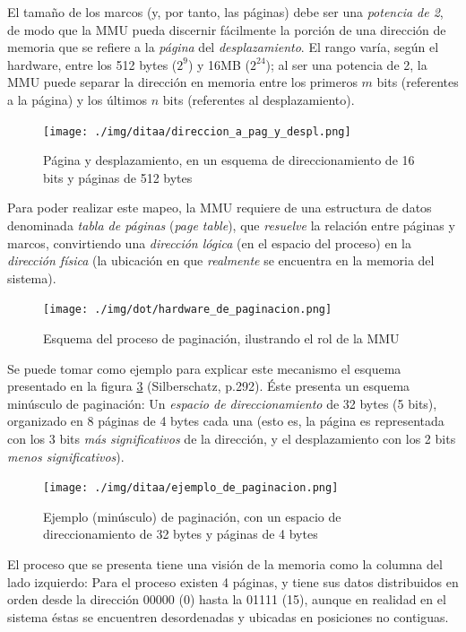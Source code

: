 \documentclass[11pt,fleqn]{book} %
\begin{document}
El tamaño de los marcos (y, por tanto, las páginas) debe ser una
\emph{potencia de 2}, de modo que la MMU pueda discernir fácilmente la
porción de una dirección de memoria que se refiere a la \emph{página} del
\emph{desplazamiento}. El rango varía, según el hardware, entre los 512
bytes ($2^9$) y 16MB ($2^{24}$); al ser una potencia de 2, la MMU puede
separar la dirección en memoria entre los primeros $m$ bits
(referentes a la página) y los últimos $n$ bits (referentes al
desplazamiento).

\begin{figure}[htb]
\centering
\texttt{[image: ./img/ditaa/direccion\_a\_pag\_y\_despl.png]}
\caption{\label{MEM_direccion_a_pag_y_despl}Página y desplazamiento, en un esquema de direccionamiento de 16 bits y páginas de 512 bytes}
\end{figure}

Para poder realizar este mapeo, la MMU requiere de una  estructura
de datos denominada \emph{tabla de páginas} (\emph{page table}), que \emph{resuelve} 
la relación entre páginas y marcos, convirtiendo una \emph{dirección lógica} 
(en el espacio del proceso) en la \emph{dirección física} (la ubicación 
en que \emph{realmente} se encuentra en la memoria del sistema).

\begin{figure}[htb]
\centering
\texttt{[image: ./img/dot/hardware\_de\_paginacion.png]}
\caption{\label{MEM_hardware_de_paginacion}Esquema del proceso de paginación, ilustrando el rol de la MMU}
\end{figure}

Se puede tomar como ejemplo para explicar este mecanismo el esquema
presentado en la figura \ref{MEM_ejemplo_de_paginacion} (Silberschatz,
p.292). Éste presenta un esquema minúsculo de paginación: Un \emph{espacio de direccionamiento} de 32
bytes (5 bits), organizado en 8 páginas de 4 bytes cada una (esto es,
la página es representada con los 3 bits \emph{más significativos} de la
dirección, y el desplazamiento con los 2 bits \emph{menos significativos}).

\begin{figure}[htb]
\centering
\texttt{[image: ./img/ditaa/ejemplo\_de\_paginacion.png]}
\caption{\label{MEM_ejemplo_de_paginacion}Ejemplo (minúsculo) de paginación, con un espacio de direccionamiento de 32 bytes y páginas de 4 bytes}
\end{figure}

El proceso que se presenta tiene una visión de la memoria como la
columna del lado izquierdo: Para el proceso existen 4 páginas, y tiene
sus datos distribuidos en orden desde la dirección 00000 (0) hasta la
01111 (15), aunque en realidad en el sistema éstas se encuentren
desordenadas y ubicadas en posiciones no contiguas.
\end{document}
